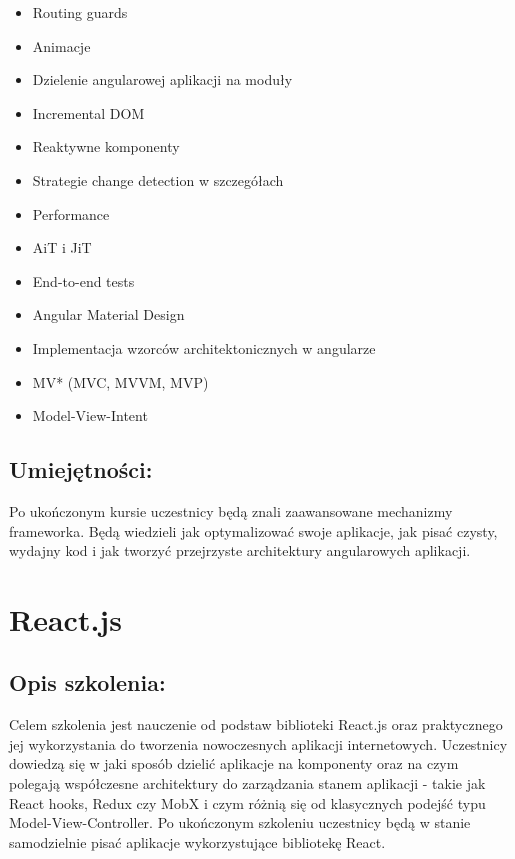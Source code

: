 \documentclass{article}[10pt]
\begin{document}
\begin{adjustwidth}{1.5cm}{}
\begin{itemize}
		\item Routing guards
		\item Animacje
		\item Dzielenie angularowej aplikacji na moduły
		\item Incremental DOM
		\item Reaktywne komponenty
		\item Strategie change detection w szczegółach
		\item Performance
		\item AiT i JiT
		\item End-to-end tests
		\item Angular Material Design
		\item Implementacja wzorców architektonicznych w angularze
		\item MV* (MVC, MVVM, MVP)
		\item Model-View-Intent
	\end{itemize}
\end{adjustwidth}

	\subsection*{Umiejętności:}
\begin{adjustwidth}{2cm}{}
\justifying
	
Po ukończonym kursie uczestnicy będą znali zaawansowane mechanizmy frameworka. Będą wiedzieli jak optymalizować swoje aplikacje, jak pisać czysty, wydajny kod i jak tworzyć przejrzyste architektury angularowych aplikacji.



\end{adjustwidth}

\newpage


    
	\section{React.js}

	\subsection*{Opis szkolenia:}
	\begin{adjustwidth}{2cm}{}
\justifying
		
Celem szkolenia jest nauczenie od podstaw biblioteki React.js oraz praktycznego jej wykorzystania do tworzenia nowoczesnych aplikacji internetowych. Uczestnicy dowiedzą się w jaki sposób dzielić aplikacje na komponenty oraz na czym polegają współczesne architektury do zarządzania stanem aplikacji - takie jak React hooks, Redux czy MobX i czym różnią się od klasycznych podejść  typu Model-View-Controller.
Po ukończonym szkoleniu uczestnicy będą w stanie samodzielnie pisać aplikacje wykorzystujące bibliotekę React. 
	\end{adjustwidth}
\end{document}
